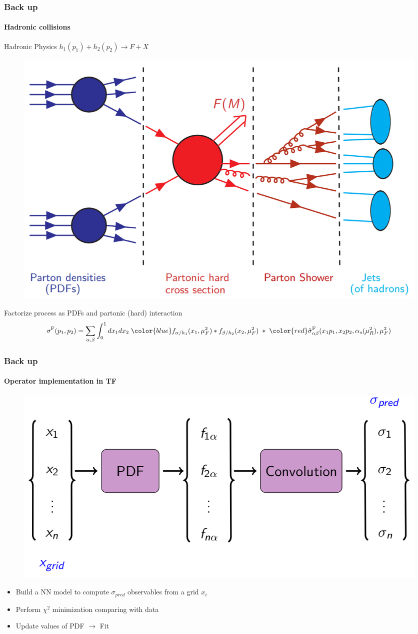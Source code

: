 \documentclass[aspectratio=43]{beamer}
\begin{document}
\begin{frame}
	
	\frametitle{Back up}
	\framesubtitle{Hadronic collisions}
	
	\center \textrm{Hadronic Physics} \footnotesize $h_{1}(p_{1}) + h_{2}(p_{2}) \rightarrow F + X$ 
	
	\begin{figure}
		\includegraphics[width = 7 cm]{plots/section1/factorization_1.png}
	\end{figure}
	
	\center \footnotesize {Factorize process as {\color{blue}PDFs} and {\color{red} partonic (hard) interaction}	
	\begin{equation}
		\sigma^{\textrm{F}}(p_{1}, p_{2}) = \sum_{\alpha, \beta}
		\int_{0}^{1} dx_{1} dx_{2} \; {\color{blue} f_{\alpha/h_{1}}(x_{1}, \mu_{F}^{2}) \ast f_{\beta/h_{2}}(x_{2}, \mu_{F}^{2})}
		\; \ast \;  
		{\color{red}\hat{\sigma}^{\textrm{F}}_{\alpha \beta}(x_{1}p_{1}, x_{2}p_{2}, \alpha_{s}(\mu_{R}^{2}), \mu_{F}^{2})} \nonumber
	\end{equation}}

\end{frame}

\begin{frame}
	
	\frametitle{Back up}
	\framesubtitle{Operator implementation in TF}
	
	\begin{figure}
		\includegraphics[width = 8.5 cm]{plots/section2/TF_convolution.png}
	\end{figure}
	
	
	\begin{itemize}
		\item \footnotesize Build a NN model to compute $\sigma_{pred}$ observables from a grid $x_{i}$
		\item \footnotesize Perform $\chi^{2}$ minimization comparing with data
		\item \footnotesize Update values of PDF $\longrightarrow$ {\color{violet} Fit}
	\end{itemize}

\end{frame}
\end{document}
